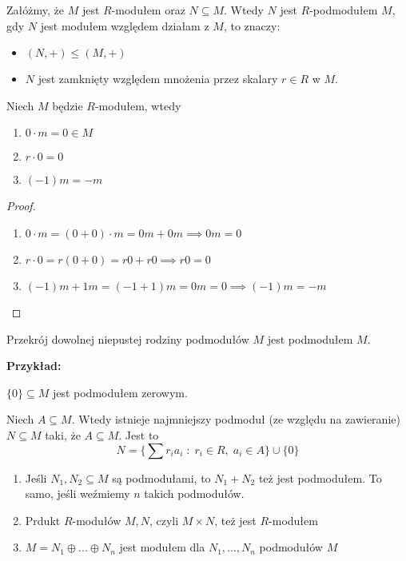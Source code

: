 \begin{definition}
  Załóżmy, że $M$ jest $R$-modułem oraz $N\subseteq M$. Wtedy $N$ jest $R$-podmodułem $M$, gdy $N$ jest modułem względem działam z $M$, to znaczy:

  \begin{itemize}
    \item[\PHtunny] $(N, +)\leq (M, +)$
    \item[\PHtunny] $N$ jest zamknięty względem mnożenia przez skalary $r\in R$ w $M$.
  \end{itemize}
\end{definition}

\begin{remark}
    Niech $M$ będzie $R$-modułem, wtedy
    \begin{enumerate}
    \item $0\cdot m=0\in M$
    \item $r\cdot 0=0$
    \item $(-1)m=-m$
    \end{enumerate}
\end{remark}

\begin{proof}$ $\newline
  \begin{enumerate}
    \item $0\cdot m=(0+0)\cdot m=0m+0m\implies 0m=0$
    \item $r\cdot 0=r(0+0)=r0+r0\implies r0=0$
    \item $(-1)m+1m=(-1+1)m=0m=0\implies (-1)m=-m$
  \end{enumerate}
\end{proof}

\begin{remark}
Przekrój dowolnej niepustej rodziny podmodułów $M$ jest podmodułem $M$.
\end{remark}

\setcounter{theorem}{5}

\textbf{Przykład:}

$\{0\}\subseteq M$ jest podmodułem zerowym.

\begin{conclusion}
    Niech $A\subseteq M$. Wtedy istnieje najmniejszy podmoduł (ze względu na zawieranie) $N\subseteq M$ taki, że $A\subseteq M$. Jest to 
    $$N=\{\sum r_ia_i\;:\;r_i\in R,\;a_i\in A\}\cup\{0\}$$
\end{conclusion}

\begin{enumerate}
    \item Jeśli $N_1,N_2\subseteq M$ są podmodułami, to $N_1+N_2$ też jest podmodułem. To samo, jeśli weźmiemy $n$ takich podmodułów.
    \item Prdukt $R$-modułów $M,N$, czyli $M\times N$, też jest $R$-modułem
    \item $M=N_1\oplus...\oplus N_n$ jest modułem dla $N_1,...,N_n$ podmodułów $M$
\end{enumerate}

